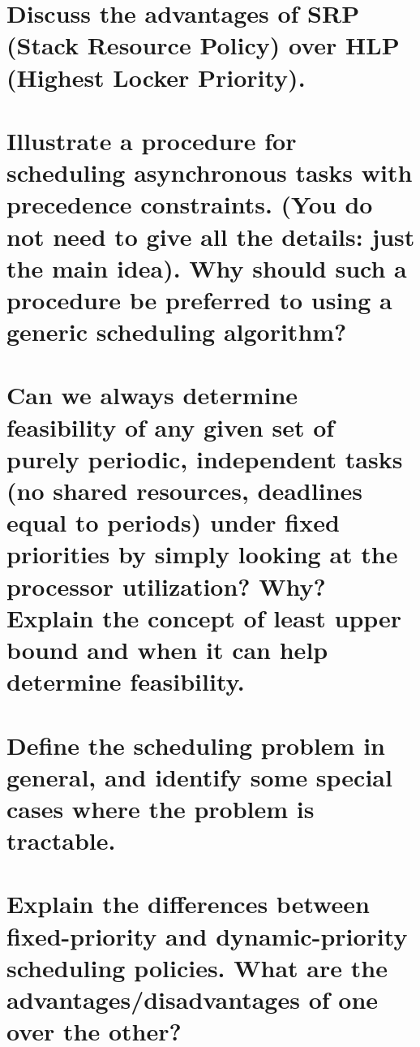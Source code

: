 \documentclass{article}
\begin{document}
\section{Discuss the advantages of SRP (Stack Resource Policy) over HLP (Highest Locker Priority).}
\section{Illustrate a procedure for scheduling asynchronous tasks with precedence constraints. (You do not need to give all the details: just the main idea). Why should such a procedure be preferred to using a generic scheduling algorithm?}
\section{Can we always determine feasibility of any given set of purely periodic, independent tasks (no shared resources, deadlines equal to periods) under fixed priorities by simply looking at the processor utilization? Why? Explain the concept of least upper bound and when it can help determine feasibility.}
\section{Define the scheduling problem in general, and identify some special cases where the problem is tractable.}
\section{Explain the differences between fixed-priority and dynamic-priority scheduling policies. What are the advantages/disadvantages of one over the other?}
\end{document}
